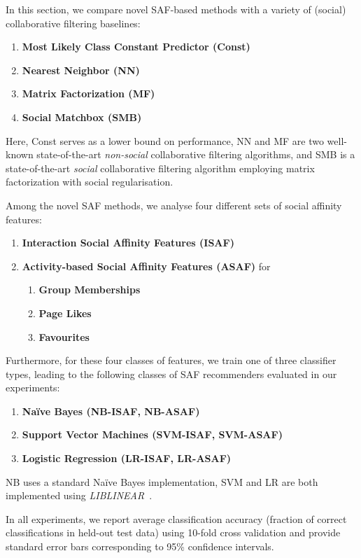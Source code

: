 In this section, we compare novel SAF-based methods with a
variety of (social) collaborative filtering baselines:
\begin{enumerate}
\item {\bf Most Likely Class Constant Predictor (Const)}
\item {\bf Nearest Neighbor (NN)}~\cite{bellkor}
\item {\bf Matrix Factorization (MF)}~\cite{pmf}
\item {\bf Social Matchbox (SMB)}~\cite{Noel2012NOF}
\end{enumerate}
Here, Const serves as a lower bound on performance, NN and MF are two
well-known state-of-the-art \emph{non-social} collaborative filtering
algorithms, and SMB is a state-of-the-art \emph{social} collaborative
filtering algorithm employing matrix factorization with social
regularisation.

Among the novel SAF methods, we analyse four different sets of 
social affinity features:
\begin{enumerate}
\item {\bf Interaction Social Affinity Features (ISAF)}
\item {\bf Activity-based Social Affinity Features (ASAF)} for 
  \begin{enumerate}
  \item {\bf Group Memberships}
  \item {\bf Page Likes}
  \item {\bf Favourites}
  \end{enumerate}
\end{enumerate}
Furthermore, for these four classes of features, we train
one of three classifier types, leading to the following
classes of SAF recommenders evaluated in our experiments:
\begin{enumerate}
  \item {\bf Na\"{i}ve Bayes (NB-ISAF, NB-ASAF)}
  \item {\bf Support Vector Machines (SVM-ISAF, SVM-ASAF)}
  \item {\bf Logistic Regression (LR-ISAF, LR-ASAF)}
\end{enumerate}
NB uses a standard Na\"{i}ve Bayes implementation, 
SVM and LR are both implemented using \textit{LIBLINEAR}~\cite{liblinear}.

In all experiments, we report average classification accuracy
(fraction of correct classifications in held-out test data) using
10-fold cross validation and provide standard error bars corresponding
to 95\% confidence intervals.

